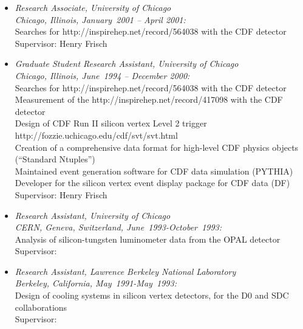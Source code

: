 \documentclass [12pt]{report}
\begin{document}
\begin{itemize}
{Reviewer of BaBar results in  and a \\ 

Supervisors:  and }

\item{{\em Research Associate, University of Chicago \\ 
Chicago, Illinois, January~2001 -- April 2001:}\\
Searches for 
{http://inspirehep.net/record/564038} 
with the CDF detector\\
Supervisor: Henry Frisch}


\item{{\em Graduate Student Research Assistant, University of Chicago \\ 
Chicago, Illinois, June~1994 -- December 2000:}\\
Searches for 
{http://inspirehep.net/record/564038} 
with the CDF detector \\
Measurement of the
{http://inspirehep.net/record/417098}
with the CDF detector \\ 
Design of CDF Run II silicon vertex Level 2 trigger 
{http://fozzie.uchicago.edu/cdf/svt/svt.html} \\
Creation of a comprehensive data format for 
high-level CDF physics objects 
(``Standard Ntuples'')\\
Maintained event generation software for CDF 
data simulation (PYTHIA)\\
Developer for the silicon vertex event display package for CDF data (DF)\\
Supervisor: Henry Frisch}

\item{{\em Research Assistant, University of Chicago \\
CERN, Geneva, Switzerland, June~1993-October~1993:}\\
Analysis of silicon-tungsten luminometer data from the OPAL detector \\
Supervisor: }

\item{{\em Research Assistant, Lawrence Berkeley National Laboratory \\
Berkeley, California, May~1991-May~1993:}\\
Design of cooling systems in silicon vertex detectors, for the D0 and 
SDC collaborations\\
Supervisor: }
\end{itemize}
\end{document}
